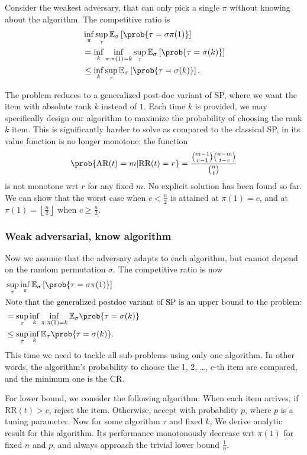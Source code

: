 Consider the weakest adversary, that can only pick a single $\pi$ without knowing about the algorithm. The competitive ratio is
\begin{align*}
	&\inf_\pi \sup_\tau \mathbb{E}_\sigma \left[ \prob{  \tau = \sigma\pi(1) }   \right]\\
	&= \inf_k \inf_{\pi:\pi(1)=k}\sup_\tau \mathbb{E}_\sigma \left[ \prob{  \tau = \sigma(k) }   \right]\\
	&\le  \inf_k \sup_\tau \mathbb{E}_\sigma \left[ \prob{  \tau = \sigma(k) }   \right]
.\end{align*}

The problem reduces to a generalized post-doc variant of SP, where we want the item with absolute rank $k$ instead of $1$. Each time $k $ is provided, we may specifically design our algorithm to maximize the probability of choosing the rank $k $ item. This is significantly harder to solve as compared to the classical SP, in its value function is no longer monotone: the function \[
\prob{\text{AR}(t) = m | \text{RR}(t) = r } = \frac{\binom{m-1}{r-1}\binom{n-m}{t-r}}{\binom{n}{t}}
\]
is not monotone wrt $r $ for any fixed $m $. No explicit solution has been found so far. We can show that the worst case when $c < \frac{n}{2}$ is attained at $\pi(1)=c $, and at $\pi(1) = \left\lfloor \frac{n}{2} \right\rfloor $ when $ c \ge  \frac{n}{2}$.

\subsubsection{Weak adversarial, know algorithm}

Now we assume that the adversary adapts to each algorithm, but cannot depend on the random permutation $\sigma$. The competitive ratio is now
\begin{align*}
	&\sup_\tau  \inf_\pi \mathbb{E}_\sigma \left[ \prob{ 
	\tau = \sigma\pi(1) }   \right] \\
\intertext{Note that the generalized postdoc variant of SP is an upper bound to the problem:}
	&= \sup_\tau \inf_k \inf_{\pi:\pi(1)=k } \mathbb{E}_\sigma \prob{ \tau =\sigma(k) }  \\
	&\le  \sup_\tau \inf_k \mathbb{E}_\sigma \prob{ \tau =\sigma(k) }  
.\end{align*}
This time we need to tackle all sub-problems using only one algorithm. In other words, the algorithm's probability to choose the 1, 2, \ldots, $c $-th item are compared, and the minimum one is the CR.

For lower bound, we consider the following algorithm: When each item arrives, if $\text{RR}(t) > c $, reject the item. Otherwise, accept with probability $p $, where $p $ is a tuning parameter. Now for some algorithm $\tau$ and fixed $k $, We derive analytic result for this algorithm. Its performance monotonously decrease wrt $\pi(1)$ for fixed $n $ and $p $, and always approach the trivial lower bound $\frac{1}{n }$. 

